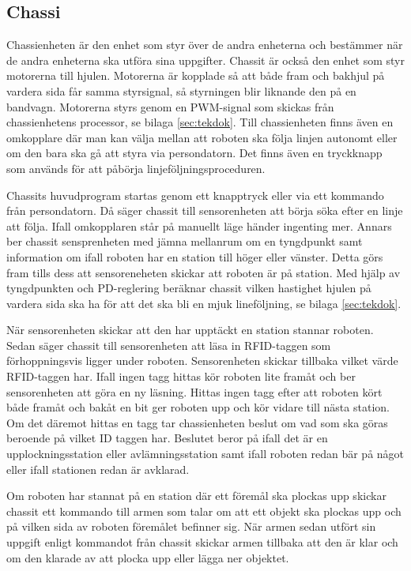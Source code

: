 
\subsection{Chassi}

Chassienheten är den enhet som styr över de andra enheterna och bestämmer när de andra enheterna ska utföra sina uppgifter. Chassit är också den enhet som styr motorerna till hjulen. Motorerna är kopplade så att både fram och bakhjul på vardera sida får samma styrsignal, så styrningen blir liknande den på en bandvagn. Motorerna styrs genom en PWM-signal som skickas från chassienhetens processor, se bilaga \ref{sec:tekdok}. Till chassienheten finns även en omkopplare där man kan välja mellan att roboten ska följa linjen autonomt eller om den bara ska gå att styra via persondatorn. Det finns även en tryckknapp som används för att påbörja linjeföljningsproceduren.


Chassits huvudprogram startas genom ett knapptryck eller via ett kommando från persondatorn. Då säger chassit till sensorenheten att börja söka efter en linje att följa. Ifall omkopplaren står på manuellt läge händer ingenting mer. Annars ber chassit sensprenheten med jämna mellanrum om en tyngdpunkt samt information om ifall roboten har en station till höger eller vänster. Detta görs fram tills dess att sensoreneheten skickar att roboten är på station. Med hjälp av tyngdpunkten och PD-reglering beräknar chassit vilken hastighet hjulen på vardera sida ska ha för att det ska bli en mjuk lineföljning, se bilaga \ref{sec:tekdok}. 

När sensorenheten skickar att den har upptäckt en station stannar roboten. Sedan säger chassit till sensorenheten att läsa in RFID-taggen som förhoppningsvis ligger under roboten. Sensorenheten skickar tillbaka vilket värde RFID-taggen har. Ifall ingen tagg hittas kör roboten lite framåt och ber sensorenheten att göra en ny läsning. Hittas ingen tagg efter att roboten kört både framåt och bakåt en bit ger roboten upp och kör vidare till nästa station. Om det däremot hittas en tagg tar chassienheten beslut om vad som ska göras beroende på vilket ID taggen har. Beslutet beror på ifall det är en upplockningsstation eller avlämningsstation samt ifall roboten redan bär på något eller ifall stationen redan är avklarad. 

Om roboten har stannat på en station där ett föremål ska plockas upp skickar chassit ett kommando till armen som talar om att ett objekt ska plockas upp och på vilken sida av roboten föremålet befinner sig. När armen sedan utfört sin uppgift enligt kommandot från chassit skickar armen tillbaka att den är klar och om den klarade av att plocka upp eller lägga ner objektet. 

